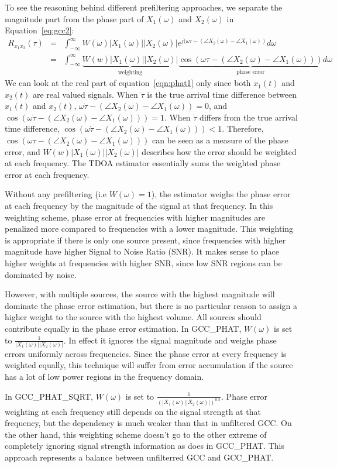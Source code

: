 To see the reasoning behind different prefiltering approaches, we separate the magnitude part from the phase part of $X_1(\omega)$ and $X_2(\omega)$ in Equation~\ref{eq:gcc2}:
\begin{eqnarray}
\label{eqn:phat1}
R_{x_1x_2}(\tau) &=& \int_{-\infty}^\infty W(\omega) |X_1(\omega)||X_2(\omega)| e^{j(\omega\tau - (\angle{X_2(\omega)} - \angle{X_1(\omega)}) } d\omega\\
&=& \int_{-\infty}^\infty \underbrace{W(w)|X_1(\omega)| |X_2(\omega)|}_{\mbox{weighting}} \underbrace{\cos(\omega\tau - (\angle X_2(\omega) - \angle X_1(\omega)))}_{\mbox{phase error}} d\omega
\end{eqnarray}
We can look at the real part of equation~\ref{eqn:phat1} only since both $x_1(t)$ and $x_2(t)$ are real valued signals. When $\dot \tau$ is the true arrival time difference between $x_1(t)$ and $x_2(t)$, $\omega \dot \tau - (\angle X_2(\omega) - \angle X_1(\omega)) = 0$, and $\cos(\omega \dot \tau - (\angle X_2(\omega) - \angle X_1(\omega))) = 1$. When $\dot \tau$ differs from the true arrival time difference, $\cos(\omega \dot \tau - (\angle X_2(\omega) - \angle X_1(\omega))) < 1$. Therefore, $\cos(\omega\tau - (\angle X_2(\omega) - \angle X_1(\omega)))$ can be seen as a measure of the phase error, and $W(w)|X_1(\omega)||X_2(\omega)|$ describes how the error should be weighted at each frequency. The TDOA estimator essentially sums the weighted phase error at each frequency. 

Without any prefiltering (i.e $W(\omega)=1$), the estimator weighs the phase error at each frequency by the magnitude of the signal at that frequency. In this weighting scheme, phase error at frequencies with higher magnitudes are penalized more compared to frequencies with a lower magnitude. This weighting is appropriate if there is only one source present, since frequencies with higher magnitude have higher Signal to Noise Ratio (SNR). It makes sense to place higher weights at frequencies with higher SNR, since low SNR regions can be dominated by noise. 

However, with multiple sources, the source with the highest magnitude will dominate the phase error estimation, but there is no particular reason to assign a higher weight to the source with the highest volume. All sources should contribute equally in the phase error estimation. In GCC\_PHAT,  $W(\omega)$ is set to $\frac{1}{|X_1(\omega)||X_2(\omega)|}$. In effect it ignores the signal magnitude and weighs phase errors uniformly across frequencies. Since the phase error at every frequency is weighted equally, this technique will suffer from error accumulation if the source has a lot of low power regions in the frequency domain.

In GCC\_PHAT\_SQRT, $W(\omega)$ is set to $\frac{1}{(|X_1(\omega)||X_2(\omega)|)^{0.5}}$. Phase error weighting at each frequency still depends on the signal strength at that frequency, but the dependency is much weaker than that in unfiltered GCC. On the other hand, this weighting scheme doesn't go to the other extreme of completely ignoring signal strength information as does in GCC\_PHAT. This approach represents a balance between unfilterred GCC and GCC\_PHAT.
